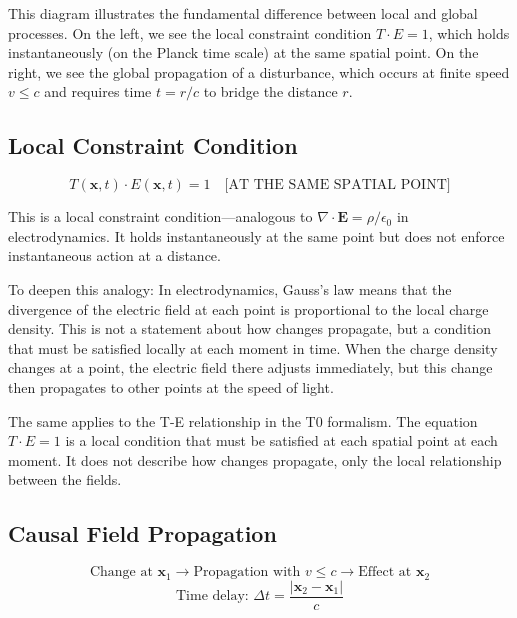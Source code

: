 	This diagram illustrates the fundamental difference between local and global processes. On the left, we see the local constraint condition $T \cdot E = 1$, which holds instantaneously (on the Planck time scale) at the same spatial point. On the right, we see the global propagation of a disturbance, which occurs at finite speed $v \leq c$ and requires time $t = r/c$ to bridge the distance $r$.
	
	\subsection{Local Constraint Condition}
	
	\begin{equation}
		T(\mathbf{x},t) \cdot E(\mathbf{x},t) = 1 \quad \text{[AT THE SAME SPATIAL POINT]} \label{eq:local_constraint}
	\end{equation}
	
	This is a local constraint condition—analogous to $\nabla \cdot \mathbf{E} = \rho/\epsilon_0$ in electrodynamics. It holds instantaneously at the same point but does not enforce instantaneous action at a distance.
	
	To deepen this analogy: In electrodynamics, Gauss's law means that the divergence of the electric field at each point is proportional to the local charge density. This is not a statement about how changes propagate, but a condition that must be satisfied locally at each moment in time. When the charge density changes at a point, the electric field there adjusts immediately, but this change then propagates to other points at the speed of light.
	
	The same applies to the T-E relationship in the T0 formalism. The equation $T \cdot E = 1$ is a local condition that must be satisfied at each spatial point at each moment. It does not describe how changes propagate, only the local relationship between the fields.
	
	\subsection{Causal Field Propagation}
	
	\begin{equation}
		\text{Change at } \mathbf{x}_1 \rightarrow \text{Propagation with } v \leq c \rightarrow \text{Effect at } \mathbf{x}_2
	\end{equation}
	\begin{equation}
		\text{Time delay: } \Delta t = \frac{|\mathbf{x}_2 - \mathbf{x}_1|}{c} \label{eq:time_delay}
	\end{equation}
	
